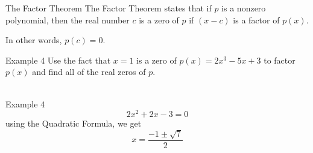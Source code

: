 \documentclass[t,usenames,dvipsnames]{beamer}
\begin{document}
\begin{frame}{The Factor Theorem}
    \alert{The Factor Theorem} states that if $p$ is a nonzero polynomial, then the real number $c$ is a zero of $p$ if $(x-c)$ is a factor of $p(x)$. \newline\\   \pause
    
    In other words, $p(c) = 0$.
\end{frame}

\begin{frame}{Example 4}
Use the fact that $x = 1$ is a zero of $p(x) = 2x^3 - 5x + 3$ to factor $p(x)$ and find all of the real zeros of $p$.   \newline\\  
   \newline\\
\begin{center}
\end{center}
\end{frame}

\begin{frame}{Example 4}
\[ 2x^2 + 2x - 3 = 0 \] \pause
using the Quadratic Formula, we get
\[ x = \frac{-1\pm \sqrt{7}}{2}  \]
\end{frame}
\end{document}

